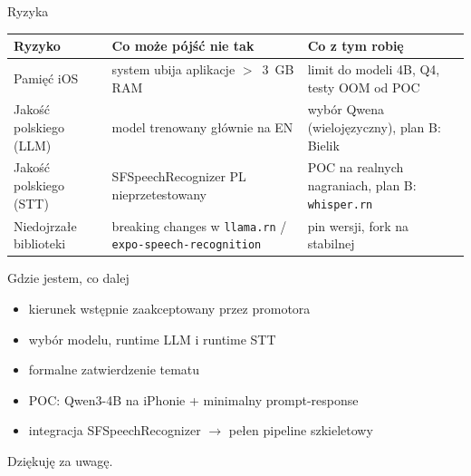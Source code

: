 \documentclass[aspectratio=169,11pt]{beamer}
\begin{document}
\begin{frame}{Ryzyka}
  \small
  \renewcommand{\arraystretch}{1.4}
  \begin{tabularx}{\textwidth}{@{}p{3.4cm} X X@{}}
    \toprule
    \textbf{Ryzyko} & \textbf{Co może pójść nie tak} & \textbf{Co z tym robię} \\
    \midrule
    Pamięć iOS              & system ubija aplikacje $>$~3~GB RAM           & limit do modeli 4B, Q4, testy OOM od POC \\
    \addlinespace
    Jakość polskiego (LLM)  & model trenowany głównie na EN                 & wybór Qwena (wielojęzyczny), plan B: Bielik \\
    \addlinespace
    Jakość polskiego (STT)  & SFSpeechRecognizer PL nieprzetestowany        & POC na realnych nagraniach, plan B: \texttt{whisper.rn} \\
    \addlinespace
    Niedojrzałe biblioteki  & breaking changes w \texttt{llama.rn} / \texttt{expo-speech-recognition} & pin wersji, fork na stabilnej \\
    \bottomrule
  \end{tabularx}
\end{frame}

\begin{frame}{Gdzie jestem, co dalej}
  \begin{itemize}
    \item[\textcolor{mGood}{\faCheck}] kierunek wstępnie zaakceptowany przez promotora
    \item[\textcolor{mGood}{\faCheck}] wybór modelu, runtime LLM i runtime STT
    \item[\textcolor{mAccent}{$\to$}] formalne zatwierdzenie tematu
    \item[\textcolor{mAccent}{$\to$}] POC: Qwen3-4B na iPhonie + minimalny prompt-response
    \item[\textcolor{mAccent}{$\to$}] integracja SFSpeechRecognizer $\to$ pełen pipeline szkieletowy
  \end{itemize}
\end{frame}

\begin{frame}[standout]
  Dziękuję za uwagę.
\end{frame}
\addtocounter{framenumber}{-1}
\end{document}
